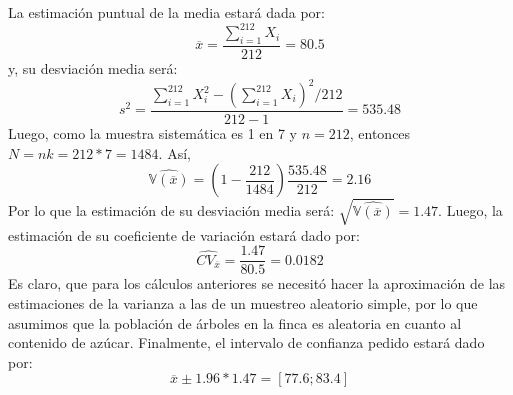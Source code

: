 \begin{solution}
La estimación puntual de la media estará dada por:
$$\overline{x}=\dfrac{\sum_{i=1}^{212}X_i}{212}=80.5$$
y, su desviación media será:
$$s^2=\dfrac{\sum_{i=1}^{212}X_{i}^{2}-\left(\sum_{i=1}^{212}X_i\right)^2/212}{212-1}=535.48$$
Luego, como la muestra sistemática es 1 en 7 y $n=212$, entonces $N=nk=212*7=1484$. Así,
$$\widehat{\mathbb{V}(\overline{x})}=\left(1-\dfrac{212}{1484}\right)\dfrac{535.48}{212}=2.16$$
Por lo que la estimación de su desviación media será: $\sqrt{\widehat{\mathbb{V}(\overline{x})}}=1.47$. Luego, la estimación de su coeficiente de variación estará dado por:
$$\widehat{CV_{\overline{x}}}=\dfrac{1.47}{80.5}=0.0182$$
Es claro, que para los cálculos anteriores se necesitó hacer la aproximación de las estimaciones de la varianza a las de un muestreo aleatorio simple, por lo que asumimos que la población de árboles en la finca es aleatoria en cuanto al contenido de azúcar. Finalmente, el intervalo de confianza pedido estará dado por:
$$\overline{x} \pm 1.96 * 1.47= [77.6;83.4]$$
\end{solution}